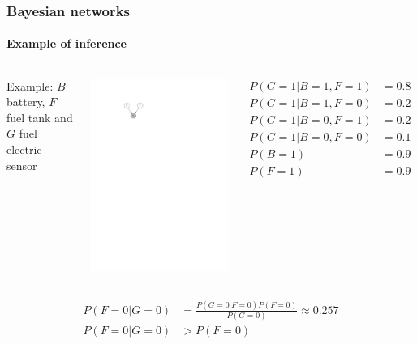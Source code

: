 \documentclass[slidestop,compress,mathserif]{beamer}
\begin{document}
\begin{frame}
	\frametitle{Bayesian networks}
	\framesubtitle{Example of inference}
     \begin{columns}
    \column[c]{6cm}
    Example: $B$ battery, $F$ fuel tank and $G$ fuel electric sensor
    \begin{center}
    \includegraphics[width=.4\textwidth]{fuel}
    \end{center}
    \column[c]{6cm}
    \begin{align*}
    P(G=1|B=1,F=1) & = 0.8\\
    P(G=1|B=1,F=0) & = 0.2\\
    P(G=1|B=0,F=1) & = 0.2\\
    P(G=1|B=0,F=0) & = 0.1\\
    P(B=1) & = 0.9\\
    P(F=1) & = 0.9
    \end{align*}
    \end{columns}
    \begin{align*}
    P(F=0|G=0) & = \frac{P(G=0|F=0)P(F=0)}{P(G=0)} \approx 0.257 \\
    P(F=0|G=0) &> P(F=0)
    \end{align*}
\end{frame}
\end{document}

